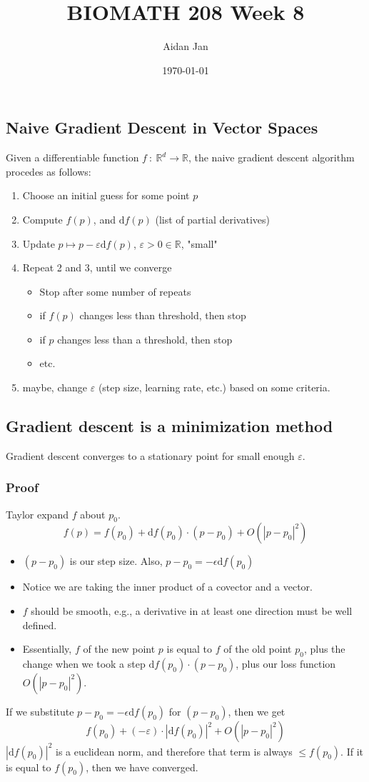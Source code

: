 \documentclass[10pt]{article}
\title{BIOMATH 208 Week 8}
\author{Aidan Jan}
\date{\today}
\newcommand{\R}{\mathbb{R}}
\newcommand{\dd}{\text{d}}
\begin{document}
\maketitle
\subsection*{Naive Gradient Descent in Vector Spaces}
Given a differentiable function $f \::\: \R^d \rightarrow \R$, the naive gradient descent algorithm procedes as follows:
\begin{enumerate}
    \item Choose an initial guess for some point $p$
    \item Compute $f(p)$, and $\dd f(p)$  (list of partial derivatives)
    \item Update $p \mapsto p - \varepsilon \dd f(p)$, $\varepsilon > 0 \in \R$, "small"
    \item Repeat 2 and 3, until we converge
    \begin{itemize}
        \item Stop after some number of repeats
        \item if $f(p)$ changes less than threshold, then stop
        \item if $p$ changes less than a threshold, then stop
        \item etc.
    \end{itemize}
    \item maybe, change $\varepsilon$ (step size, learning rate, etc.) based on some criteria.
\end{enumerate}

\subsection*{Gradient descent is a minimization method}
Gradient descent converges to a stationary point for small enough $\varepsilon$.

\subsubsection*{Proof}
Taylor expand $f$ about $p_0$.
\[f(p) = f(p_0) + \dd f(p_0) \cdot (p - p_0) + O(|p - p_0|^2)\]
\begin{itemize}
	\item $(p - p_0)$ is our step size.  Also, $p - p_0 = -\epsilon \dd f(p_0)$
	\item Notice we are taking the inner product of a covector and a vector.
	\item $f$ should be smooth, e.g., a derivative in at least one direction must be well defined.
	\item Essentially, $f$ of the new point $p$ is equal to $f$ of the old point $p_0$, plus the change when we took a step $\dd f(p_0) \cdot (p - p_0)$, plus our loss function $O(|p - p_0|^2)$.
\end{itemize}
If we substitute $p - p_0 = -\epsilon \dd f(p_0)$ for $(p - p_0)$, then we get
\[f(p_0) + (-\varepsilon) \cdot |\dd f(p_0)|^2 + O(|p - p_0|^2)\]
$|\dd f(p_0)|^2$ is a euclidean norm, and therefore that term is always $\leq f(p_0)$.  If it is equal to $f(p_0)$, then we have converged.
\end{document}
